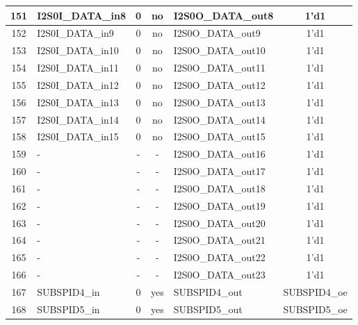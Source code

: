 \begin{longtable}[c]{|c|l|c|c|l|c|}
151  &         I2S0I\_DATA\_in8  &  0  &   no  &       I2S0O\_DATA\_out8  &               1'd1  \\\hline
152  &         I2S0I\_DATA\_in9  &  0  &   no  &       I2S0O\_DATA\_out9  &               1'd1  \\\hline
153  &        I2S0I\_DATA\_in10  &  0  &   no  &      I2S0O\_DATA\_out10  &               1'd1  \\\hline
154  &        I2S0I\_DATA\_in11  &  0  &   no  &      I2S0O\_DATA\_out11  &               1'd1  \\\hline
155  &        I2S0I\_DATA\_in12  &  0  &   no  &      I2S0O\_DATA\_out12  &               1'd1  \\\hline
156  &        I2S0I\_DATA\_in13  &  0  &   no  &      I2S0O\_DATA\_out13  &               1'd1  \\\hline
157  &        I2S0I\_DATA\_in14  &  0  &   no  &      I2S0O\_DATA\_out14  &               1'd1  \\\hline
158  &        I2S0I\_DATA\_in15  &  0  &   no  &      I2S0O\_DATA\_out15  &               1'd1  \\\hline
159  &                        -  &  -  &    -  &      I2S0O\_DATA\_out16  &               1'd1  \\\hline
160  &                        -  &  -  &    -  &      I2S0O\_DATA\_out17  &               1'd1  \\\hline
161  &                        -  &  -  &    -  &      I2S0O\_DATA\_out18  &               1'd1  \\\hline
162  &                        -  &  -  &    -  &      I2S0O\_DATA\_out19  &               1'd1  \\\hline
163  &                        -  &  -  &    -  &      I2S0O\_DATA\_out20  &               1'd1  \\\hline
164  &                        -  &  -  &    -  &      I2S0O\_DATA\_out21  &               1'd1  \\\hline
165  &                        -  &  -  &    -  &      I2S0O\_DATA\_out22  &               1'd1  \\\hline
166  &                        -  &  -  &    -  &      I2S0O\_DATA\_out23  &               1'd1  \\\hline
167  &             SUBSPID4\_in  &  0  &  yes  &           SUBSPID4\_out  &       SUBSPID4\_oe  \\\hline
168  &             SUBSPID5\_in  &  0  &  yes  &           SUBSPID5\_out  &       SUBSPID5\_oe  \\\hline

\end{longtable}
